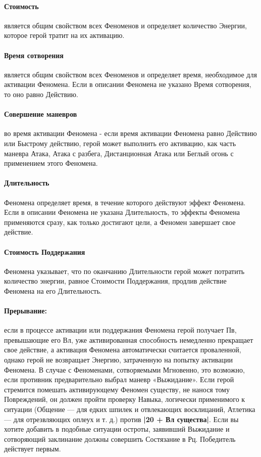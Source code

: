 \paragraph{Стоимость} является общим свойством всех Феноменов и определяет количество Энергии, которое герой тратит на их активацию.
\paragraph{Время сотворения} является общим свойством всех Феноменов и определяет время, необходимое для активации Феномена. Если в описании Феномена не указано Время сотворения, то оно равно Действию.
\paragraph{Совершение маневров} во время активации Феномена - если время активации Феномена равно Действию или Быстрому действию, герой может выполнить его активацию, как часть маневра Атака, Атака с разбега, Дистанционная Атака или Беглый огонь с применением этого Феномена.
\paragraph{Длительность} Феномена определяет время, в течение которого действуют эффект Феномена. Если в описании Феномена не указана Длительность, то эффекты Феномена применяются сразу, как только достигают цели, а Феномен завершает свое действие.
\paragraph{Стоимость Поддержания} Феномена указывает, что по оканчанию Длительности герой может потратить количество энергии, равное Стоимости Поддержания, продлив действие Феномена на его Длительность.
\paragraph{Прерывание:} если в процессе активации или поддержания Феномена герой получает Пв, превышающие его Вл, уже активированная способность немедленно прекращает свое действие, а активация Феномена автоматически считается проваленной, однако герой не возвращает Энергию, затраченную на попытку активации Феномена. В случае с Феноменами, сотворяемыми Мгновенно, это возможно, если противник предварительно выбрал маневр «Выжидание».
\newline
Если герой стремится помешать активирующему Феномен существу, не нанося тому Повреждений, он должен пройти проверку Навыка, логически применимого к ситуации (Общение — для едких шпилек и отвлекающих восклицаний, Атлетика — для отрезвляющих оплеух и т. д.) против \textbf{|20 + Вл существа|}.
\newline
Если вы хотите добавить в подобные ситуации остроты, заявивший Выжидание и сотворяющий заклинание должны совершить Состязание в Рц. Победитель действует первым.
